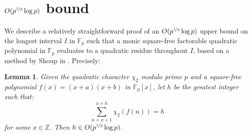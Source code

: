 \documentclass{report}
\newtheorem*{lemma*}{Lemma}
\begin{document}
\section{$O(p^{\nicefrac{1}{2}}\log p)$ bound}
%
We describe a relatively straightforward proof of an $O(p^{\nicefrac{1}{2}}\log p)$ upper bound on the longest interval $I$ in $\mathbb{F}_p$ such that a monic square-free factorable quadratic polynomial in $\mathbb{F}_p$ evaluates to a quadratic residue throughout $I$, based on a method by Shoup in \cite{shoup}. Precisely:
\begin{lemma*}
Given the quadratic character $\chi_2$ modulo prime $p$ and a square-free polynomial $f(x)=(x+a)(x+b)$ in $\mathbb{F}_p[x]$, let $h$ be the greatest integer such that:
\[\sum\limits_{n=x+1}^{x+h}\chi_2(f(n))=h\]
 for some $x\in\mathbb{Z}$. Then $h \in O(p^{\nicefrac{1}{2}}\log p)$.
\end{lemma*}
\end{document}
